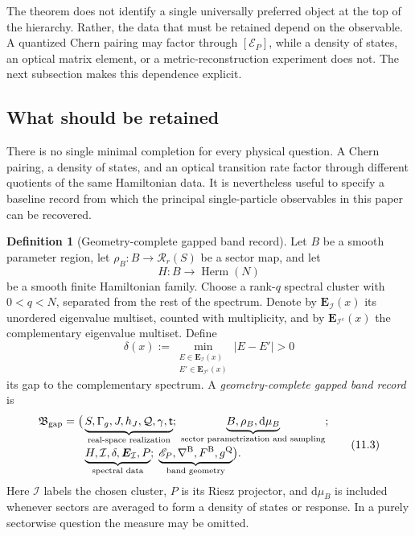 \documentclass[11pt]{article}
\theoremstyle{definition}
\newtheorem{definition}[theorem]{Definition}
\theoremstyle{remark}
\newcommand{\cR}{\mathcal R}
\newcommand{\dd}{\mathrm d}
\begin{document}
The theorem does not identify a single universally preferred object at the
top of the hierarchy.  Rather, the data that must be retained depend on the
observable.  A quantized Chern pairing may factor through
\([\mathscr E_P]\), while a density of states, an optical matrix element, or
a metric-reconstruction experiment does not.  The next subsection makes this
dependence explicit.

\subsection{What should be retained}

There is no single minimal completion for every physical question.  A Chern
pairing, a density of states, and an optical transition rate factor through
different quotients of the same Hamiltonian data.  It is nevertheless useful
to specify a baseline record from which the principal single-particle
observables in this paper can be recovered.

\begin{definition}[Geometry-complete gapped band record]
\label{def:geometry-complete}
Let \(B\) be a smooth parameter region, let
\(\rho_B:B\to\cR_r(S)\) be a sector map, and let
\[
                  H:B\longrightarrow\operatorname{Herm}(N)
\]
be a smooth finite Hamiltonian family.  Choose a rank-\(q\) spectral cluster
with \(0<q<N\), separated from the rest of the spectrum.  Denote by
\(\boldsymbol E_{\mathcal I}(x)\) its unordered eigenvalue multiset, counted
with multiplicity, and by
\(\boldsymbol E_{\mathcal I^c}(x)\) the complementary eigenvalue multiset.
Define
\[
 \delta(x)
   :=\min_{\substack{
        E\in\boldsymbol E_{\mathcal I}(x)\\
        E'\in\boldsymbol E_{\mathcal I^c}(x)}}
       |E-E'|>0
\]
its gap to the complementary spectrum.  A
\emph{geometry-complete gapped band record} is
\[
\begin{aligned}
\mathfrak B_{\mathrm{gap}}
=\bigl(&
 \underbrace{S,\Gamma_g,J,h_J,\mathcal Q,\gamma,\mathsf t}
             _{\text{real-space realization}};\;
 \underbrace{B,\rho_B,\dd\mu_B}
             _{\text{sector parametrization and sampling}};\notag\\[-1mm]
&\underbrace{H,\mathcal I,\delta,
             \boldsymbol E_{\mathcal I},P}
             _{\text{spectral data}};\;
 \underbrace{\mathscr E_P,\nabla^{\mathrm B},
             F^{\mathrm B},g^{\mathrm Q}}
             _{\text{band geometry}}
\bigr).
\end{aligned}
\tag{11.3}\label{eq:complete-record}
\]
Here \(\mathcal I\) labels the chosen cluster,
\(P\) is its Riesz projector, and \(\dd\mu_B\) is included whenever sectors
are averaged to form a density of states or response.  In a purely
sectorwise question the measure may be omitted.
\end{definition}
\end{document}
